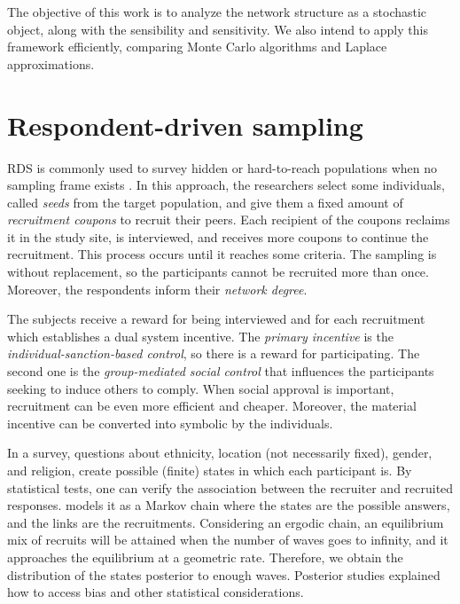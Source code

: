 The objective of this work is to analyze the network structure as a stochastic object, along with the sensibility and sensitivity. We also intend to apply this framework efficiently, comparing Monte Carlo algorithms and Laplace approximations.

\section{Respondent-driven sampling}

RDS is commonly used to survey hidden or hard-to-reach populations when
no sampling frame exists \cite{heckathorn1997}. In this approach, the
researchers select some individuals, called {\em seeds} from the target
population, and give them a fixed amount of {\em recruitment coupons} to
recruit their peers. Each recipient of the coupons reclaims it in the study
site, is interviewed, and receives more coupons to continue the recruitment.
This process occurs until it reaches some criteria. The sampling is without
replacement, so the participants cannot be recruited more than once. Moreover,
the respondents inform their {\em network degree}.

The subjects receive a reward for being interviewed and for each recruitment
which establishes a dual system incentive. The {\em primary incentive} is the
{\em individual-sanction-based control}, so there is a reward for
participating. The second one is the {\em group-mediated social control} that
influences the participants seeking to induce others to comply. When social
approval is important, recruitment can be even more efficient and cheaper.
Moreover, the material incentive can be converted into symbolic by the
individuals. 

In a survey, questions about ethnicity, location (not necessarily fixed),
gender, and religion, create possible (finite) states in which each
participant is. By statistical tests, one can verify the association between
the recruiter and recruited responses. \citeauthor{heckathorn1997} models it
as a Markov chain where the states are the possible answers, and the links are
the recruitments. Considering an ergodic chain, an equilibrium mix of recruits
will be attained when the number of waves goes to infinity, and it approaches
the equilibrium at a geometric rate. Therefore, we obtain the distribution of
the states posterior to enough waves. Posterior studies \cite{heckathorn2002}
explained how to access bias and other statistical considerations. 

